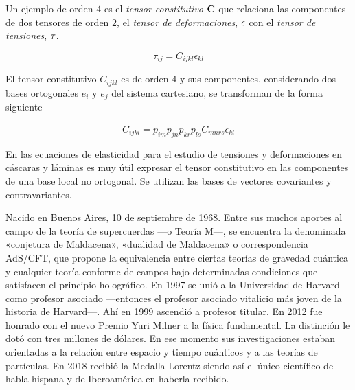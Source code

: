 \bigskip


Un ejemplo de orden $4$ es el \textit{tensor constitutivo} $\bold C$ que relaciona las componentes de dos tensores de orden $2$, el \textit{tensor de deformaciones}, $\bold{\epsilon}$ con el \textit{tensor de tensiones},  $\bold{\tau}$.


$$ \tau_{ij}= {C}_{ijkl} \epsilon_{kl}  $$

El tensor constitutivo $C_{ijkl}$ es de orden  $4$ y sus componentes, considerando dos bases ortogonales $e_i$ y $\overline e_j$ del sistema cartesiano,  se transforman de la forma siguiente

$$\overline{ C}_{ijkl}= p_{im}p_{jn}p_{kr}p_{ls}   {C}_{mnrs} \epsilon_{kl}   $$


\begin{remark}
En las  ecuaciones de elasticidad para  el estudio de tensiones y deformaciones en cáscaras y láminas es muy útil expresar  el tensor constitutivo en las componentes de una base local no ortogonal. Se utilizan las bases de vectores  covariantes y contravariantes.
\end{remark}

\bigskip






\begin{parchment}
{Nacido en Buenos Aires, 10 de septiembre de 1968. Entre sus muchos aportes al campo de la teoría de supercuerdas —o Teoría M—, se encuentra la denominada «conjetura de Maldacena», «dualidad de Maldacena» o correspondencia AdS/CFT, que propone la equivalencia entre ciertas teorías de gravedad cuántica y cualquier teoría conforme de campos bajo determinadas condiciones que satisfacen el principio holográfico. En 1997 se unió a la Universidad de Harvard como profesor asociado —entonces el profesor asociado vitalicio más joven de la historia de Harvard—. Ahí en 1999 ascendió a profesor titular. En 2012 fue honrado con el nuevo Premio Yuri Milner a la física fundamental. La distinción le dotó con tres millones de dólares. En ese momento sus investigaciones estaban orientadas a la relación entre espacio y tiempo cuánticos y a las teorías de partículas. En 2018 recibió la Medalla Lorentz siendo así el único científico de habla hispana y de Iberoamérica en haberla recibido. \cite{Malda}}
\end{parchment}

\bigskip


\newpage


